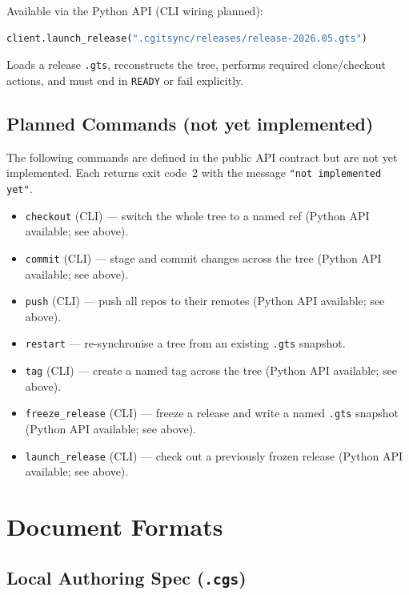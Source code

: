 \documentclass[11pt,a4paper]{article}
\begin{document}
Available via the Python API (CLI wiring planned):

\begin{lstlisting}[language=Python]
client.launch_release(".cgitsync/releases/release-2026.05.gts")
\end{lstlisting}

Loads a release \texttt{.gts}, reconstructs the tree, performs required
clone/checkout actions, and must end in \texttt{READY} or fail explicitly.

\subsection{Planned Commands (not yet implemented)}

The following commands are defined in the public API contract but are not yet
implemented. Each returns exit code~2 with the message
\texttt{"not implemented yet"}.

\begin{itemize}
  \item \texttt{checkout} (CLI) — switch the whole tree to a named ref
    (Python API available; see above).
  \item \texttt{commit} (CLI) — stage and commit changes across the tree
    (Python API available; see above).
  \item \texttt{push} (CLI) — push all repos to their remotes
    (Python API available; see above).
  \item \texttt{restart} — re-synchronise a tree from an existing \texttt{.gts} snapshot.
  \item \texttt{tag} (CLI) — create a named tag across the tree
    (Python API available; see above).
  \item \texttt{freeze\_release} (CLI) — freeze a release and write a named
    \texttt{.gts} snapshot (Python API available; see above).
  \item \texttt{launch\_release} (CLI) — check out a previously frozen release
    (Python API available; see above).
\end{itemize}

\section{Document Formats}

\subsection{Local Authoring Spec (\texttt{.cgs})}
\end{document}
